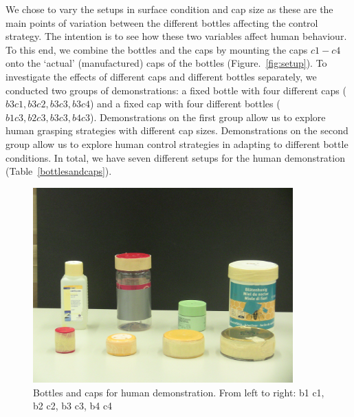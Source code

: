 We chose to vary the setups in surface condition and cap size as these
are the main points of variation between the different bottles
affecting the control strategy. The intention is to see how these two
variables affect human behaviour. To this end, we combine the bottles
and the caps by mounting the caps $c1-c4$ onto the `actual'
(manufactured) caps of the bottles (Figure.~\ref{fig:setup}). To
investigate the effects of different caps and different bottles
separately, we conducted two groups of demonstrations: a fixed bottle with
four different caps ($b3c1, b3c2, b3c3, b3c4$) and a fixed cap with four
different bottles ($b1c3, b2c3, b3c3, b4c3$). Demonstrations on the
first group allow us to explore human grasping strategies with
different cap sizes. Demonstrations on the second group allow us to
explore human control strategies in adapting to different bottle
conditions. In total, we have seven different setups for the human
demonstration (Table~\ref{bottlesandcaps}).


\begin{figure}
  \centering
  \includegraphics[width=10cm]{./fig_cha4/b_c.jpg}
  \caption{ \scriptsize{Bottles and caps for human demonstration. From left to right: b1 c1, b2 c2, b3 c3, b4  c4}
}
\label{fig:b_c}
\end{figure}






